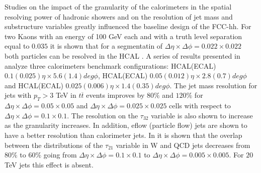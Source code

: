 Studies on the impact of the granularity of the calorimeters in the spatial resolving power of hadronic showers and on the resolution of jet mass and substructure variables greatly influenced the baseline design of the FCC-hh. For two Kaons with an energy of 100 GeV each and with a truth level separation equal to $0.035$ it is shown that for a segmentatin of $\Delta\eta\times\Delta\phi=0.022\times0.022$ both particles can be resolved in the HCAL \cite{FCC_HCALgran_doubleK}. A series of results presented in \cite{BOOST2017,FCCweek2015,FCCweek2016} analyze three calorimeters benchmark configurations: HCAL(ECAL) $0.1(0.025) \eta\times5.6(1.4) deg \phi$, HCAL(ECAL) $0.05(0.012) \eta\times2.8(0.7) deg \phi$ and HCAL(ECAL) $0.025(0.006) \eta \times 1.4(0.35) deg \phi$. The jet mass resolution for jets with $p_T>3$ TeV in $t\overline{t}$ events improves by $80 \%$ and $120 \%$ for $\Delta\eta\times\Delta\phi = 0.05 \times 0.05$ and $\Delta\eta\times\Delta\phi = 0.025 \times 0.025$ cells with respect to $\Delta\eta\times\Delta\phi = 0.1\times0.1$. The resolution on the $\tau_{32}$ variable is also shown to increase as the granularity increases. In addition, eflow (particle flow) jets are shown to have a better resolution than calorimeter jets. In \cite{BOOST2017} it is shown that the overlap between the distributions of the $\tau_{21}$ variable in W and QCD jets decreases from $80\%$ to $60\%$ going from $\Delta\eta\times\Delta\phi = 0.1 \times 0.1$ to $\Delta\eta\times\Delta\phi = 0.005 \times 0.005$. For $20$ TeV jets this effect is absent.



